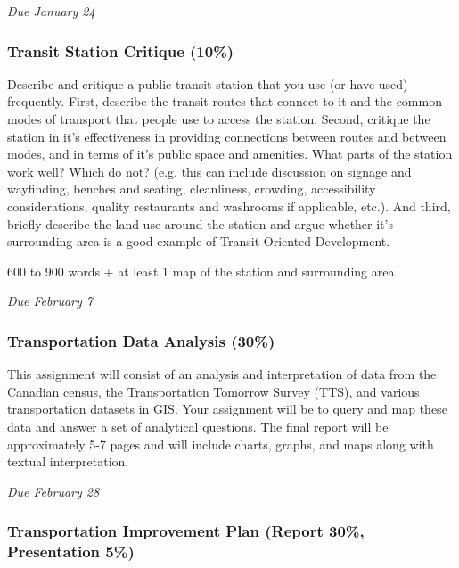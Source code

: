 \documentclass[11pt]{article}
\begin{document}
	\textit{Due January 24}
	
	
	
	
	\subsubsection*{Transit Station Critique (10\%)}
	
	Describe and critique a public transit station that you use (or have used) frequently. First, describe the transit routes that connect to it and the common modes of transport that people use to access the station. Second, critique the station in it's effectiveness in providing connections between routes and between modes, and in terms of it's public space and amenities. What parts of the station work well? Which do not? (e.g. this can include discussion on signage and wayfinding, benches and seating, cleanliness, crowding, accessibility considerations, quality restaurants and washrooms if applicable, etc.). And third, briefly describe the land use around the station and argue whether it's surrounding area is a good example of Transit Oriented Development. 
	
	600 to 900 words + at least 1 map of the station and surrounding area
	
	\textit{Due February 7}
	
	
	
	
	\subsubsection*{Transportation Data Analysis (30\%)}
	
	This assignment will consist of an analysis and interpretation of data from the Canadian census, the Transportation Tomorrow Survey (TTS), and various transportation datasets in GIS. Your assignment will be to query and map these data and answer a set of analytical questions. The final report will be approximately 5-7 pages and will include charts, graphs, and maps along with textual interpretation.
	
	\textit{Due February 28}
	
	
	
	\subsubsection*{Transportation Improvement Plan (Report 30\%, Presentation 5\%)}
	
\end{document}
